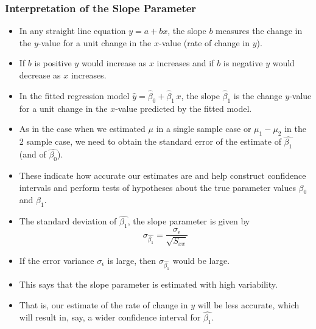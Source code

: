 \documentclass[xcolor=dvipsnames,12pt]{beamer}
\begin{document}
\begin{frame}
\frametitle{Interpretation of the Slope Parameter}
\begin{itemize}
\item In any straight line equation $y=a +bx$, the slope $b$ measures 
the change in the $y$-value for a unit change in the $x$-value
(rate of change in  $y$).
\item If $b$ is positive  $y$ would increase as  $x$ increases and if
$b$ is negative $y$ would decrease as  $x$ increases.
\item In the fitted regression model $  \hat{y} = \hat{\beta}_0 +
\hat{\beta}_1\,x$, the slope $\hat{\beta}_1$ is the change
$y$-value for  a unit change in the $x$-value predicted by the
fitted model.
\end{itemize}
\end{frame}



\begin{frame}
\begin{itemize}
\item As in the case when we estimated $\mu$ in a single sample case
or  $\mu_1-\mu_2$ in the 2 sample case, we need to obtain the
standard error of the estimate of $\hat{\beta_1}$ (and of  
$\hat{\beta_0}$). 
\item These indicate how accurate our estimates are
and help construct confidence intervals and perform tests of
hypotheses about the true parameter values $\beta_0$ and  $\beta_1$.
\end{itemize}
\end{frame}



\begin{frame}
\begin{itemize}
\item The standard deviation of $\hat{\beta_1}$, the slope parameter
is given by 
$$ \sigma_{\hat{\beta_1}}=\frac{\sigma_{\epsilon}}{\sqrt{S_{xx}}}$$
\item If the error variance $\sigma_{\epsilon}$ is large, then
$\sigma_{\hat{\beta_1}}$ would be large. 
\item This says that the slope 
parameter is estimated with high variability. 
\item That is, our estimate
of the rate of change in $y$ will be less accurate, which will
result in, say, a wider confidence interval for $\hat{\beta_1}$.
\end{itemize}
\end{frame}
\end{document}
